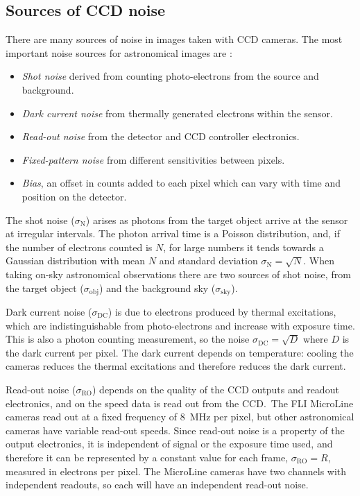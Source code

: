 \subsection{Sources of CCD noise}
\label{sec:noise}
\begin{colsection}

There are many sources of noise in images taken with CCD cameras. The most important noise sources for astronomical images are \citep{CCDs}:
%
\begin{itemize}
    \item \emph{Shot noise} derived from counting photo-electrons from the source and background.
    \item \emph{Dark current noise} from thermally generated electrons within the sensor.
    \item \emph{Read-out noise} from the detector and CCD controller electronics.
    \item \emph{Fixed-pattern noise} from different sensitivities between pixels.
    \item \emph{Bias}, an offset in counts added to each pixel which can vary with time and position on the detector.
\end{itemize}

The shot noise ($\sigma_\text{N}$) arises as photons from the target object arrive at the sensor at irregular intervals. The photon arrival time is a Poisson distribution, and, if the number of electrons counted is $N$, for large numbers it tends towards a Gaussian distribution with mean $N$ and standard deviation $\sigma_\text{N} = \sqrt{N}$. When taking on-sky astronomical observations there are two sources of shot noise, from the target object ($\sigma_\text{obj}$) and the background sky ($\sigma_\text{sky}$).

Dark current noise ($\sigma_\text{DC}$) is due to electrons produced by thermal excitations, which are indistinguishable from photo-electrons and increase with exposure time. This is also a photon counting measurement, so the noise $\sigma_\text{DC} = \sqrt{D}$ where $D$ is the dark current per pixel. The dark current depends on temperature: cooling the cameras reduces the thermal excitations and therefore reduces the dark current.

Read-out noise ($\sigma_\text{RO}$) depends on the quality of the CCD outputs and readout electronics, and on the speed data is read out from the CCD.\ The FLI MicroLine cameras read out at a fixed frequency of \SI{8}{\mega\hertz} per pixel, but other astronomical cameras have variable read-out speeds. Since read-out noise is a property of the output electronics, it is independent of signal or the exposure time used, and therefore it can be represented by a constant value for each frame, $\sigma_\text{RO} = R$, measured in electrons per pixel. The MicroLine cameras have two channels with independent readouts, so each will have an independent read-out noise.


\end{colsection}
